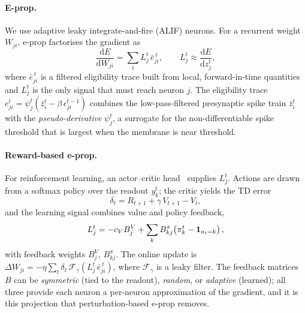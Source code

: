 \documentclass[10pt,twocolumn]{article}
\newcommand{\method}{perturbation-based e-prop}   %
\begin{document}
\paragraph{E-prop.}
We use adaptive leaky integrate-and-fire (ALIF) neurons. For a recurrent weight
$W_{ji}$, e-prop factorises the gradient as
\begin{equation}
\frac{\mathrm{d}E}{\mathrm{d}W_{ji}} = \sum_t L^t_j\,\bar{e}^{\,t}_{ji},
\qquad L^t_j \approx \frac{\mathrm{d}E}{\mathrm{d}z^t_j},
\label{eq:eprop-factorisation}
\end{equation}
where $\bar e^{\,t}_{ji}$ is a filtered eligibility trace built from local,
forward-in-time quantities and $L^t_j$ is the only signal that must reach
neuron $j$. The eligibility trace $e^t_{ji}=\psi^t_j(\bar z^t_i-\beta\,
\epsilon^{t-1}_{ji})$ combines the low-pass-filtered presynaptic spike train
$\bar z^t_i$ with the \emph{pseudo-derivative} $\psi^t_j$, a surrogate for the
non-differentiable spike threshold that is largest when the membrane is near
threshold.

\paragraph{Reward-based e-prop.}
For reinforcement learning, an actor--critic head~\citep{Konda2000ActorCritic} supplies $L^t_j$. Actions are
drawn from a softmax policy over the readout $y^t_k$; the critic yields the
TD error
\begin{equation}
\delta_t = R_{t+1} + \gamma\, V_{t+1} - V_t,
\label{eq:tderror}
\end{equation}
and the learning signal combines value and policy feedback,
\begin{equation}
L^t_j = -c_V B^V_j + \sum_k B^\pi_{kj}\!\left(\pi^t_k - \mathbbm{1}_{a_t=k}\right),
\label{eq:learning-signal}
\end{equation}
with feedback weights $B^V_j$, $B^\pi_{kj}$. The online update is
$\Delta W_{ji} = -\eta\sum_t \delta_t\,\mathcal{F}_{\gamma}(L^t_j\,\bar
e^{\,t}_{ji})$, where $\mathcal{F}_{\gamma}$ is a leaky filter. The feedback
matrices $B$ can be \emph{symmetric} (tied to the readout), \emph{random}, or
\emph{adaptive} (learned); all three provide each neuron a per-neuron
approximation of the gradient, and it is this projection that \method{} removes.
\end{document}

